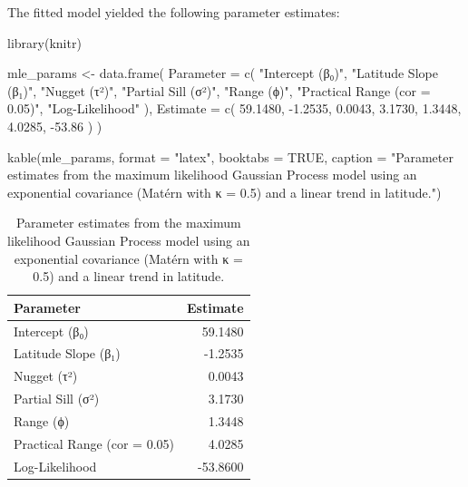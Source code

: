 \documentclass[
  11pt,
]{article}
\newenvironment{Shaded}{\begin{snugshade}}{\end{snugshade}}
\newcommand{\AttributeTok}[1]{\textcolor[rgb]{0.40,0.45,0.13}{#1}}
\newcommand{\ConstantTok}[1]{\textcolor[rgb]{0.56,0.35,0.01}{#1}}
\newcommand{\FloatTok}[1]{\textcolor[rgb]{0.68,0.00,0.00}{#1}}
\newcommand{\FunctionTok}[1]{\textcolor[rgb]{0.28,0.35,0.67}{#1}}
\newcommand{\NormalTok}[1]{\textcolor[rgb]{0.00,0.23,0.31}{#1}}
\newcommand{\OtherTok}[1]{\textcolor[rgb]{0.00,0.23,0.31}{#1}}
\newcommand{\SpecialCharTok}[1]{\textcolor[rgb]{0.37,0.37,0.37}{#1}}
\newcommand{\StringTok}[1]{\textcolor[rgb]{0.13,0.47,0.30}{#1}}
\begin{document}
The fitted model yielded the following parameter estimates:

\begin{Shaded}
\begin{Highlighting}[]
\FunctionTok{library}\NormalTok{(knitr)}

\NormalTok{mle\_params }\OtherTok{\textless{}{-}} \FunctionTok{data.frame}\NormalTok{(}
  \AttributeTok{Parameter =} \FunctionTok{c}\NormalTok{(}
    \StringTok{"Intercept (β₀)"}\NormalTok{,}
    \StringTok{"Latitude Slope (β₁)"}\NormalTok{,}
    \StringTok{"Nugget (τ²)"}\NormalTok{,}
    \StringTok{"Partial Sill (σ²)"}\NormalTok{,}
    \StringTok{"Range (ϕ)"}\NormalTok{,}
    \StringTok{"Practical Range (cor = 0.05)"}\NormalTok{,}
    \StringTok{"Log{-}Likelihood"}
\NormalTok{  ),}
  \AttributeTok{Estimate =} \FunctionTok{c}\NormalTok{(}
    \FloatTok{59.1480}\NormalTok{,}
    \SpecialCharTok{{-}}\FloatTok{1.2535}\NormalTok{,}
    \FloatTok{0.0043}\NormalTok{,}
    \FloatTok{3.1730}\NormalTok{,}
    \FloatTok{1.3448}\NormalTok{,}
    \FloatTok{4.0285}\NormalTok{,}
    \SpecialCharTok{{-}}\FloatTok{53.86}
\NormalTok{  )}
\NormalTok{)}

\FunctionTok{kable}\NormalTok{(mle\_params, }\AttributeTok{format =} \StringTok{"latex"}\NormalTok{, }\AttributeTok{booktabs =} \ConstantTok{TRUE}\NormalTok{,}
      \AttributeTok{caption =} \StringTok{"Parameter estimates from the maximum likelihood Gaussian Process model using an exponential covariance (Matérn with κ = 0.5) and a linear trend in latitude."}\NormalTok{)}
\end{Highlighting}
\end{Shaded}

\begin{table}

\caption{Parameter estimates from the maximum likelihood Gaussian Process model
using an exponential covariance (Matérn with κ = 0.5) and a linear trend
in latitude.}
\centering
\begin{tabular}[t]{lr}
\toprule
Parameter & Estimate\\
\midrule
Intercept (β₀) & 59.1480\\
Latitude Slope (β₁) & -1.2535\\
Nugget (τ²) & 0.0043\\
Partial Sill (σ²) & 3.1730\\
Range (ϕ) & 1.3448\\
\addlinespace
Practical Range (cor = 0.05) & 4.0285\\
Log-Likelihood & -53.8600\\
\bottomrule
\end{tabular}
\end{table}
\end{document}
